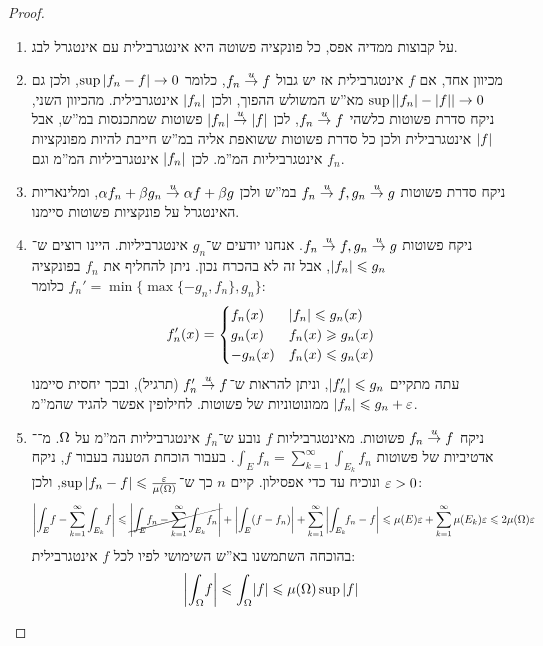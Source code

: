 \documentclass[name=רשימות פונקציות ממשיות – WIP]{../../../tex/classes/noChapterMegasumPreamble}
\begin{document}
	\begin{proof}
		\begin{enumerate}
			\item על קבוצות ממדיה אפס, כל פונקציה פשוטה היא אינטגרבילית עם אינטגרל לבג. 
			\item מכיוון אחד, אם $f$ אינטגרבילית אז יש גבול $f_n \overset{u}{\to} f$, כלומר $\sup\left \lvert f_n - f \right \rvert \to 0$, ולכן גם $\sup\left \lvert \left \lvert f_n \right \rvert - \left \lvert f \right \rvert \right \rvert \to 0$ מא''ש המשולש ההפוך, ולכן $\left \lvert f_n \right \rvert$ אינטגרבילית. מהכיוון השני, ניקח סדרת פשוטות כלשהי $f_n \overset{u}{\to} f$, לכן $\left \lvert f_n \right \rvert \overset{u}{\to} \left \lvert f \right \rvert$ פשוטות שמתכנסות במ''ש, אבל $\left \lvert f \right \rvert$ אינטגרבילית ולכן כל סדרת פשוטות ששואפת אליה במ''ש חייבת להיות מפונקציות אינטגרביליות המ''מ. לכן $\left \lvert f_n \right \rvert$ אינטגרביליות המ''מ וגם $f_n$. 
			\item ניקח סדרת פשוטות $f_n \overset{u}{\to} f, g_n \overset{u}{\to} g$ במ''ש ולכן $\alpha f_n + \beta g_n \overset{u}{\to} \alpha f + \beta g$, ומלינאריות האינטגרל על פונקציות פשוטות סיימנו. 
			\item ניקח פשוטות $f_n \overset{u}{\to} f, g_n \overset{u}{\to} g$. אנחנו יודעים ש־$g_n$ אינטגרביליות. היינו רוצים ש־$\left \lvert f_n \right \rvert \leqslant g_n$, אבל זה לא בהכרח נכון. ניתן להחליף את $f_n$ בפונקציה $f_n' = \min\{\max\{-g_n, f_n\}, g_n\}$ כלומר: 
			\[ f_n'(x) = \begin{cases}
				f_n(x) & \left \lvert f_n \right \rvert \leqslant g_n(x) \\
				g_n(x) & f_n(x) \geqslant g_n(x) \\
				-g_n(x) & f_n(x) \leqslant g_n(x)
			\end{cases} \]
			עתה מתקיים $\left \lvert f_n' \right \rvert \leqslant g_n$, וניתן להראות ש־$f_n' \overset{u}{\to} f$ (תרגיל), ובכך יחסית סיימנו ממונוטוניות של פשוטות. לחילופין אפשר להגיד שהמ''מ $\sof{f_n} \le g_n + \eg$. 
			\item ניקח $f_n \overset{u}{\to} f$ פשוטות. מאינטגרביליות $f$ נובע ש־$f_n$ אינטגרביליות המ''מ על $\Omega$. מ־\ס־אדטיביות של פשוטות $\int_Ef_n = \sum_{k = 1}^{\infty}\int_{E_k}f_n$. בעבור הוכחת הטענה בעבור $f$, ניקח $\eg > 0$ ונוכיח עד כדי אפסילון. קיים $n$ כך ש־$\sup\sof{f_n - f} \le \frac{\eg}{\mu(\Og)}$, ולכן: 
			\[ \sof{\int_E\! f - \sum_{k =1}^{\infty}\int_{E_k}\!f} \le \cancel{\sof{\int_E\!f_n - \sum_{k = 1}^{\infty}\int_{E_k}\!f_n}} + \sof{\int_E\!\cl{f - f_n}} + \sum_{k = 1}^{\infty}\sof{\int_{E_k}\!\!f_n - f} \le \mu(E)\eg + \sum_{k = 1}^{\infty}\mu(E_k)\eg \le 2 \mu(\Og)\eg \]
			בהוכחה השתמשנו בא''ש השימושי לפיו לכל $f$ אינטגרבילית:
			\[ \left \lvert \int _\Omega \!f \right \rvert \leqslant \int_\Omega \!\left \lvert f \right \rvert \leqslant \mu(\Omega)\sup \left \lvert f \right \rvert \]
		\end{enumerate}\envendproof
	\end{proof}
	
\end{document}
